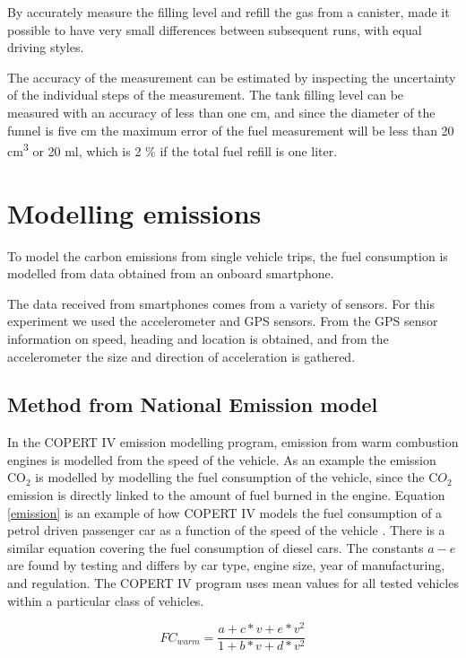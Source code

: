 \documentclass[conference]{IEEEtran}
\begin{document}
By accurately measure the filling level and refill the gas from a canister, made it possible to have very small differences between subsequent runs, with equal driving styles. 

The accuracy of the measurement can be estimated by inspecting the uncertainty of the individual steps of the measurement. The tank filling level can be measured with an accuracy of less than one cm, and since the diameter of the funnel is five cm the maximum error of the fuel measurement will be less than 20 cm\textsuperscript{3} or 20 ml, which is 2 \% if the total fuel refill is one liter.
\section{Modelling emissions}

To model the carbon emissions from single vehicle trips, the fuel consumption is modelled from data obtained from an onboard smartphone.
\label{sec:modeling}

The data received from smartphones comes from a variety of sensors. For this experiment we used the accelerometer and GPS sensors. From the GPS sensor information on speed, heading and location is obtained, and from the accelerometer the size and direction of acceleration is gathered.

\subsection{Method from National Emission model}

In the COPERT IV emission modelling program, emission from warm combustion engines is modelled from the speed of the vehicle. As an example the emission CO$_2$ is modelled by modelling the fuel consumption of the vehicle, since the C$O_2$ emission is directly linked to the amount of fuel burned in the engine. Equation \ref{emission} is an example of how COPERT IV models the fuel consumption of a petrol driven passenger car as a function of the speed of the vehicle \cite{Ntziachristos2012}. There is a similar equation covering the fuel consumption of diesel cars. The constants $a-e$ are found by testing and differs by car type, engine size, year of manufacturing, and regulation. The COPERT IV program uses mean values for all tested vehicles within a particular class of vehicles.

\begin{equation}
	FC_{warm} = \frac{a + c*v + e*v^2}{1 + b*v + d*v^2}
	\label{emission}
\end{equation}
\end{document}
